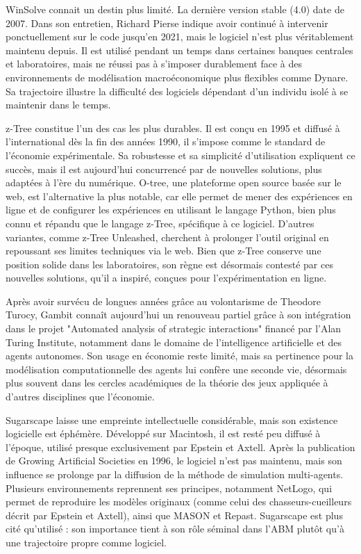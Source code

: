 WinSolve connait un destin plus limité. La dernière version stable (4.0) date de 2007. Dans son entretien, Richard Pierse indique avoir continué à intervenir ponctuellement sur le code jusqu’en 2021, mais le logiciel n’est plus véritablement maintenu depuis. Il est utilisé pendant un temps dans certaines banques centrales et laboratoires, mais ne réussi pas à s’imposer durablement face à des environnements de modélisation macroéconomique plus flexibles comme Dynare. Sa trajectoire illustre la difficulté des logiciels dépendant d’un individu isolé à se maintenir dans le temps.

z-Tree constitue l’un des cas les plus durables. Il est conçu en 1995 et diffusé à l’international dès la fin des années 1990, il s'impose comme le standard de l’économie expérimentale. Sa robustesse et sa simplicité d’utilisation expliquent ce succès, mais il est aujourd’hui concurrencé par de nouvelles solutions, plus adaptées à l'ère du numérique. O-tree, une plateforme open source basée sur le web, est l'alternative la plus notable, car elle permet de mener des expériences en ligne et de configurer les expériences en utilisant le langage Python, bien plus connu et répandu que le langage z-Tree, spécifique à ce logiciel. D'autres variantes, comme z-Tree Unleashed, cherchent à prolonger l'outil original en repoussant ses limites techniques via le web. Bien que z-Tree conserve une position solide dans les laboratoires, son règne est désormais contesté par ces nouvelles solutions, qu'il a inspiré, conçues pour l'expérimentation en ligne.


Après avoir survécu de longues années grâce au volontarisme de Theodore Turocy, Gambit connaît aujourd’hui un renouveau partiel grâce à son intégration dans le projet "Automated analysis of strategic interactions" financé par l’Alan Turing Institute, notamment dans le domaine de l’intelligence artificielle et des agents autonomes. Son usage en économie reste limité, mais sa pertinence pour la modélisation computationnelle des agents lui confère une seconde vie, désormais plus souvent dans les cercles académiques de la théorie des jeux appliquée à d'autres disciplines que l'économie.


Sugarscape laisse une empreinte intellectuelle considérable, mais son existence logicielle est éphémère. Développé sur Macintosh, il est resté peu diffusé à l’époque, utilisé presque exclusivement par Epstein et Axtell. Après la publication de Growing Artificial Societies en 1996, le logiciel n’est pas maintenu, mais son influence se prolonge par la diffusion de la méthode de simulation multi-agents. Plusieurs environnements reprennent ses principes, notamment NetLogo, qui permet de reproduire les modèles originaux (comme celui des chasseurs-cueilleurs décrit par Epstein et Axtell), ainsi que MASON et Repast. Sugarscape est plus cité qu’utilisé : son importance tient à son rôle séminal dans l’ABM plutôt qu’à une trajectoire propre comme logiciel.


